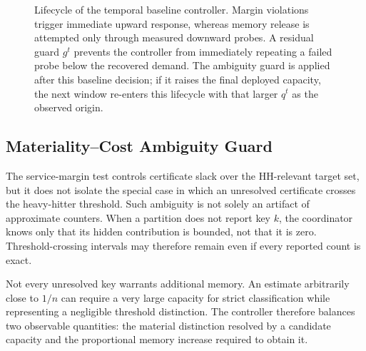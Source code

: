 \documentclass[sigconf, nonacm]{acmart}
\begin{document}
\begin{figure}[t]
{%
}
\caption{Lifecycle of the temporal baseline controller. Margin violations trigger immediate upward response, whereas memory release is attempted only through measured downward probes. A residual guard \(g^t\) prevents the controller from immediately repeating a failed probe below the recovered demand. The ambiguity guard is applied after this baseline decision; if it raises the final deployed capacity, the next window re-enters this lifecycle with that larger \(q^t\) as the observed origin.}
\label{fig:controller-lifecycle}
\end{figure}

\subsection{Materiality--Cost Ambiguity Guard}
\label{subsec:ambiguity}
\label{subsec:pred-effective}

The service-margin test controls certificate slack over the HH-relevant target set, but it does not isolate the special case in which an unresolved certificate crosses the heavy-hitter threshold. Such ambiguity is not solely an artifact of approximate counters. When a partition does not report key \(k\), the coordinator knows only that its hidden contribution is bounded, not that it is zero. Threshold-crossing intervals may therefore remain even if every reported count is exact.

Not every unresolved key warrants additional memory. An estimate arbitrarily close to \(1/n\) can require a very large capacity for strict classification while representing a negligible threshold distinction. The controller therefore balances two observable quantities: the material distinction resolved by a candidate capacity and the proportional memory increase required to obtain it.
\end{document}
